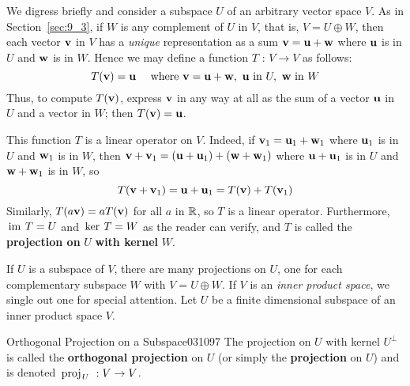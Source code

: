 We digress briefly and consider a subspace $U$ of an arbitrary vector space $V$. As in Section~\ref{sec:9_3}, if $W$ is any complement of $U$ in $V$, that is, $V = U \oplus W$, then each vector $\textbf{v}$ in $V$ has a \textit{unique} representation as a sum $\textbf{v} = \textbf{u} + \textbf{w}$ where $\textbf{u}$ is in $U$ and $\textbf{w}$ is in $W$. Hence we may define a function $T$ : $V \to V$ as follows:
\begin{equation*}
T(\textbf{v}) = \textbf{u} \quad \mbox{ where } \textbf{v} = \textbf{u} + \textbf{w}, \ \textbf{u} \mbox{ in } U, \ \textbf{w} \mbox{ in } W
\end{equation*}
Thus, to compute $T(\textbf{v})$, express $\textbf{v}$ in any way at all as the sum of a vector $\textbf{u}$ in $U$ and a vector in $W$; then $T(\textbf{v}) = \textbf{u}$.

This function $T$ is a linear operator on $V$. Indeed, if $\textbf{v}_{1} = \textbf{u}_{1} + \textbf{w}_{1}$ where $\textbf{u}_{1}$ is in $U$ and $\textbf{w}_{1}$ is in $W$, then $\textbf{v} + \textbf{v}_{1} = (\textbf{u} + \textbf{u}_{1}) + (\textbf{w} + \textbf{w}_{1})$ where $\textbf{u} + \textbf{u}_{1}$ is in $U$ and $\textbf{w} + \textbf{w}_{1}$ is in $W$, so
\begin{equation*}
T(\textbf{v} + \textbf{v}_1) = \textbf{u} + \textbf{u}_1 = T(\textbf{v}) + T(\textbf{v}_1)
\end{equation*}
Similarly, $T(a\textbf{v}) = aT(\textbf{v})$ for all $a$ in $\mathbb{R}$, so $T$ is a linear operator. Furthermore, $\thinspace\operatorname{im\medspace} T = U$ and $\thinspace\operatorname{ker\medspace} T = W$ as the reader can verify, and $T$ is called the \textbf{projection on} $U$ \textbf{with kernel} $W$.

If $U$ is a subspace of $V$, there are many projections on $U$, one for each complementary subspace $W$ with $V = U \oplus W$. If $V$ is an \textit{inner product space}, we single out one for special attention. Let $U$ be a finite dimensional subspace of an inner product space $V$.

\begin{definition}{Orthogonal Projection on a Subspace}{031097}
The projection on $U$ with kernel $U^{\perp}$ is called the \textbf{orthogonal projection} on $U$ (or simply the \textbf{projection} on $U$) and is
denoted $\thinspace\operatorname{proj\medspace}_{\!U}\,{} : V \to V$.
\end{definition}

